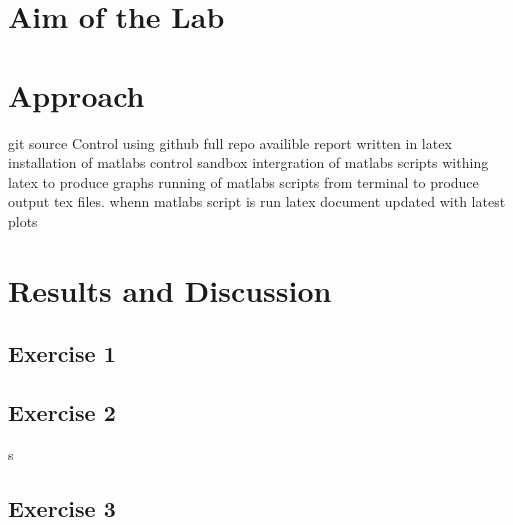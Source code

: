 







\tableofcontents
\pagebreak


\newpage\section{Aim of the Lab}


\newpage\section{Approach}

git source Control using github full repo availible
report written in latex
installation of matlabs control sandbox
intergration of matlabs scripts withing latex to produce graphs 
running of matlabs scripts from terminal to produce output tex files. whenn matlabs script is run latex document updated with latest plots

\newpage\section{Results and Discussion}

\subsection{Exercise 1}


\subsection{Exercise 2}
s
\subsection{Exercise 3}

